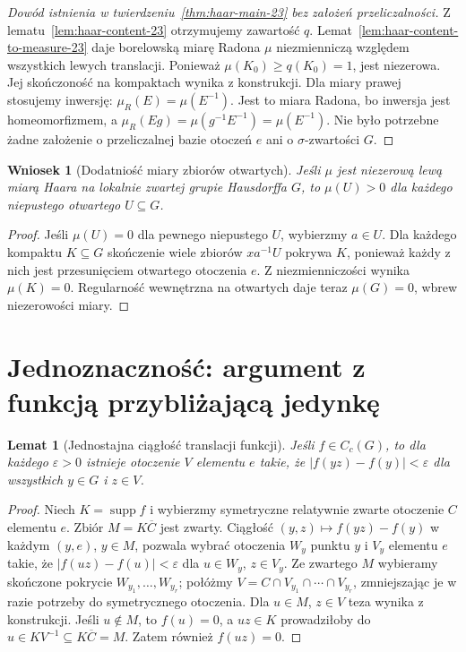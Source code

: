 \documentclass[11pt,a4paper,oneside]{book}
\numberwithin{equation}{chapter}
\theoremstyle{plain}
\newtheorem{lemat}[twierdzenie]{Lemat}
\newtheorem{wniosek}[twierdzenie]{Wniosek}
\theoremstyle{definition}
\theoremstyle{remark}
\begin{document}
\begin{proof}[Dowód istnienia w twierdzeniu~\ref{thm:haar-main-23}
bez założeń przeliczalności]
Z lematu~\ref{lem:haar-content-23} otrzymujemy
zawartość $q$. Lemat~\ref{lem:haar-content-to-measure-23}
daje borelowską miarę Radona $\mu$ niezmienniczą
względem wszystkich lewych translacji.
Ponieważ $\mu(K_0)\ge q(K_0)=1$, jest niezerowa.
Jej skończoność na kompaktach wynika z konstrukcji.
Dla miary prawej stosujemy inwersję:
$\mu_R(E)=\mu(E^{-1})$.
Jest to miara Radona, bo inwersja jest homeomorfizmem,
a $\mu_R(Eg)=\mu(g^{-1}E^{-1})=\mu(E^{-1})$.
Nie było potrzebne żadne założenie o przeliczalnej bazie
otoczeń $e$ ani o $\sigma$-zwartości $G$.
\end{proof}

\begin{wniosek}[Dodatniość miary zbiorów otwartych]
\label{cor:haar-open-positive-23}
Jeśli $\mu$ jest niezerową lewą miarą Haara
na lokalnie zwartej grupie Hausdorffa $G$, to
$\mu(U)>0$ dla każdego niepustego otwartego $U\subseteq G$.
\end{wniosek}
\begin{proof}
Jeśli $\mu(U)=0$ dla pewnego niepustego $U$, wybierzmy
$a\in U$. Dla każdego kompaktu $K\subseteq G$ skończenie
wiele zbiorów $xa^{-1}U$ pokrywa $K$, ponieważ każdy
z nich jest przesunięciem otwartego otoczenia $e$.
Z niezmienniczości wynika $\mu(K)=0$.
Regularność wewnętrzna na otwartych daje teraz
$\mu(G)=0$, wbrew niezerowości miary.
\end{proof}

\section{Jednoznaczność: argument z funkcją przybliżającą jedynkę}
\begin{lemat}[Jednostajna ciągłość translacji funkcji]
\label{lem:haar-uniform-23}
Jeśli $f\in C_c(G)$, to dla każdego $\varepsilon>0$
istnieje otoczenie $V$ elementu $e$ takie, że
$|f(yz)-f(y)|<\varepsilon$ dla wszystkich
$y\in G$ i $z\in V$.
\end{lemat}
\begin{proof}
Niech $K=\operatorname{supp}f$ i wybierzmy symetryczne
relatywnie zwarte otoczenie $C$ elementu $e$.
Zbiór $M=K\overline C$ jest zwarty. Ciągłość
$(y,z)\mapsto f(yz)-f(y)$ w każdym $(y,e)$,
$y\in M$, pozwala wybrać otoczenia $W_y$ punktu $y$
i $V_y$ elementu $e$ takie, że
$|f(uz)-f(u)|<\varepsilon$ dla $u\in W_y$, $z\in V_y$.
Ze zwartego $M$ wybieramy skończone pokrycie
$W_{y_1},\dots,W_{y_r}$; połóżmy
$V=C\cap V_{y_1}\cap\cdots\cap V_{y_r}$,
zmniejszając je w razie potrzeby do symetrycznego
otoczenia. Dla $u\in M$, $z\in V$ teza wynika
z konstrukcji. Jeśli $u\notin M$, to $f(u)=0$,
a $uz\in K$ prowadziłoby do
$u\in K V^{-1}\subseteq K\overline C=M$.
Zatem również $f(uz)=0$.
\end{proof}
\end{document}
